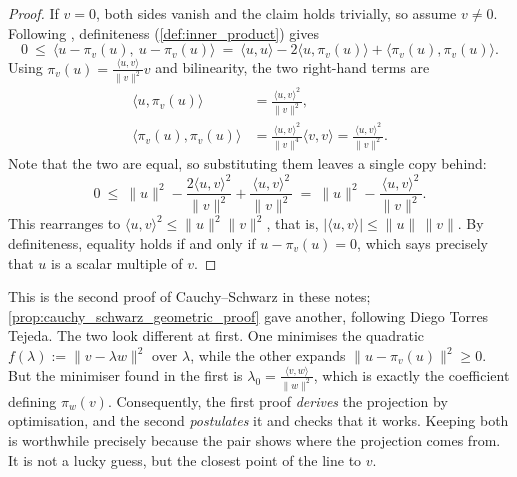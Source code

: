 \begin{proof}
If $v = 0$, both sides vanish and the claim holds trivially, so assume $v \neq 0$. Following
, definiteness (\cref{def:inner_product}) gives
\[
  0 \ \leq\ \langle u-\pi_v(u),\ u-\pi_v(u)\rangle
    \ =\ \langle u,u\rangle - 2\langle u,\pi_v(u)\rangle + \langle \pi_v(u),\pi_v(u)\rangle.
\]
Using $\pi_v(u) = \tfrac{\langle u,v\rangle}{\|v\|^2}v$ and bilinearity, the two right-hand terms
are
\begin{align*}
  \langle u,\pi_v(u)\rangle &= \frac{\langle u,v\rangle^2}{\|v\|^2}, \\[0.3ex]
  \langle \pi_v(u),\pi_v(u)\rangle
    &= \frac{\langle u,v\rangle^2}{\|v\|^4}\langle v,v\rangle
     = \frac{\langle u,v\rangle^2}{\|v\|^2}.
\end{align*}
Note that the two are equal, so substituting them leaves a single copy behind:
\[
  0 \ \leq\ \|u\|^2 - \frac{2\langle u,v\rangle^2}{\|v\|^2} + \frac{\langle u,v\rangle^2}{\|v\|^2}
    \ =\ \|u\|^2 - \frac{\langle u,v\rangle^2}{\|v\|^2}.
\]
This rearranges to $\langle u,v\rangle^2 \leq \|u\|^2\|v\|^2$, that is,
$|\langle u,v\rangle| \leq \|u\|\,\|v\|$. By definiteness, equality holds if and only if
$u - \pi_v(u) = 0$, which says precisely that $u$ is a scalar multiple of $v$.
\end{proof}

\begin{remark}
\label{rem:two_proofs_cauchy_schwarz}
This is the second proof of Cauchy--Schwarz in these notes;
\cref{prop:cauchy_schwarz_geometric_proof} gave another, following Diego Torres
Tejeda. The two look different at first. One minimises the quadratic
$f(\lambda) := \|v-\lambda w\|^2$ over $\lambda$, while the other expands
$\|u-\pi_v(u)\|^2 \geq 0$. But the minimiser found in the first is
$\lambda_0 = \tfrac{\langle v,w\rangle}{\|w\|^2}$, which is exactly the coefficient defining
$\pi_w(v)$. Consequently, the first proof \emph{derives} the projection by optimisation, and the
second \emph{postulates} it and checks that it works. Keeping both is worthwhile precisely because
the pair shows where the projection comes from. It is not a lucky guess, but the closest point of
the line to $v$.
\end{remark}

